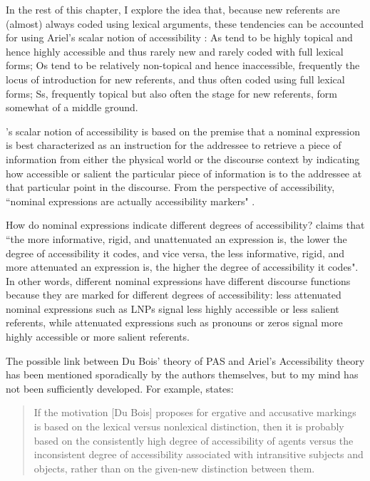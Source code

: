 In the rest of this chapter, I explore the idea that, because new referents are (almost) always coded using lexical arguments, these tendencies can be accounted for using Ariel's scalar notion of accessibility \citep{ariel1990,ariel2001}: As tend to be highly topical and hence highly accessible and thus rarely new and rarely coded with full lexical forms; Os tend to be relatively non-topical and hence inaccessible, frequently the locus of introduction for new referents, and thus often coded using full lexical forms; Ss, frequently topical but also often the stage for new referents, form somewhat of a middle ground.

\citet{ariel1990,ariel2001}'s scalar notion of accessibility is based on the premise that a nominal expression is best characterized as an instruction for the addressee to retrieve a piece of information from either the physical world or the discourse context by indicating how accessible or salient the particular piece of information is to the addressee at that particular point in the discourse. From the perspective of accessibility, ``nominal expressions are actually accessibility markers" \citep[31]{ariel2001}. 

How do nominal expressions indicate different degrees of accessibility? \citet[32]{ariel2001} claims that ``the more informative, rigid, and unattenuated an expression is, the lower the degree of accessibility it codes, and vice versa, the less informative, rigid, and more attenuated an expression is, the higher the degree of accessibility it codes". In other words, different nominal expressions have different discourse functions because they are marked for different degrees of accessibility: less attenuated nominal expressions such as LNPs signal less highly accessible or less salient referents, while attenuated expressions such as pronouns or zeros signal more highly accessible or more salient referents. 

The possible link between Du Bois' theory of PAS and Ariel's Accessibility theory has been mentioned sporadically by the authors themselves, but to my mind has not been sufficiently developed. For example, \citet[67]{ariel2001} states:

\begin{quote} If the motivation [Du Bois] proposes for ergative and accusative markings is based on the lexical versus nonlexical distinction, then it is probably based on the consistently high degree of accessibility of agents versus the inconsistent degree of accessibility associated with intransitive subjects and objects, rather than on the given-new distinction between them.
\end{quote}

